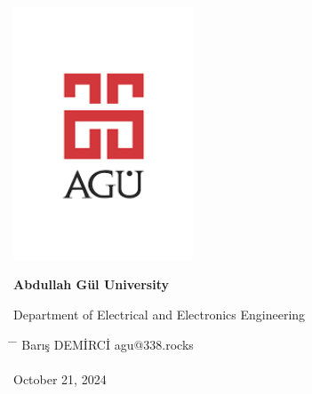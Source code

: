 \begin{center}
	\includegraphics[width=0.4\textwidth]{assets/agu.png}

	\Huge
	\textbf{Abdullah Gül University}
	
	\vspace{0.3cm}
	Department of Electrical and Electronics Engineering

	\vspace{1cm}
	\Huge
	\textbf{\paperTitle}

	\vspace{0.3cm}
	\Huge
	\paperSubTitle{}

	\vspace{0.8cm}
	\large
	\vspace{0.5cm}
	\LARGE
	\vspace{1.5cm}
	\textbf{}
	\vfill
	\vspace{0.8cm}
	\Large
\end{center}

\begin{tabbing}
	\hspace*{1em}\= \hspace*{8em} \= \kill
	\> Barış DEMİRCİ \> agu@338.rocks \\
	\> \> \\
	\> October 21, 2024 \> \\
\end{tabbing}
